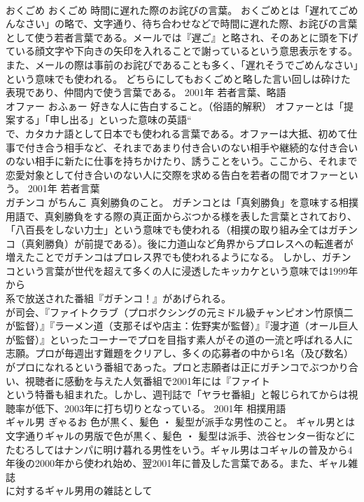 \documentclass[8pt]{extreport}
\begin{document}
\begin{CJK}{UTF8}{min}
\\	おくごめ	おくごめ	時間に遅れた際のお詫びの言葉。	おくごめとは「遅れてごめんなさい」の略で、文字通り、待ち合わせなどで時間に遅れた際、お詫びの言葉として使う若者言葉である。メールでは『遅ご』と略され、そのあとに頭を下げている顔文字や下向きの矢印を入れることで謝っているという意思表示をする。また、メールの際は事前のお詫びであることも多く、「遅れそうでごめんなさい」という意味でも使われる。 どちらにしてもおくごめと略した言い回しは砕けた表現であり、仲間内で使う言葉である。	2001年	若者言葉、略語	
\\	オファー	おふぁー	好きな人に告白すること。（俗語的解釈）	オファーとは「提案する」「申し出る」といった意味の英語“
\\	で、カタカナ語として日本でも使われる言葉である。オファーは大抵、初めて仕事で付き合う相手など、それまであまり付き合いのない相手や継続的な付き合いのない相手に新たに仕事を持ちかけたり、誘うことをいう。ここから、それまで恋愛対象として付き合いのない人に交際を求める告白を若者の間でオファーという。	2001年	若者言葉	
\\	ガチンコ	がちんこ	真剣勝負のこと。	ガチンコとは「真剣勝負」を意味する相撲用語で、真剣勝負をする際の真正面からぶつかる様を表した言葉とされており、「八百長をしない力士」という意味でも使われる（相撲の取り組み全てはガチンコ（真剣勝負）が前提である）。後に力道山など角界からプロレスへの転進者が増えたことでガチンコはプロレス界でも使われるようになる。 しかし、ガチンコという言葉が世代を超えて多くの人に浸透したキッカケという意味では1999年から
\\	系で放送された番組『ガチンコ！』があげられる。
\\	が司会、『ファイトクラブ（プロボクシングの元ミドル級チャンピオン竹原慎二が監督）』『ラーメン道（支那そばや店主：佐野実が監督）』『漫才道（オール巨人が監督）』といったコーナーでプロを目指す素人がその道の一流と呼ばれる人に志願。プロが毎週出す難題をクリアし、多くの応募者の中から1名（及び数名）がプロになれるという番組であった。プロと志願者は正にガチンコでぶつかり合い、視聴者に感動を与えた人気番組で2001年には『ファイト
\\	という特番も組まれた。しかし、週刊誌で「ヤラセ番組」と報じられてからは視聴率が低下、2003年に打ち切りとなっている。	2001年	相撲用語	
\\	ギャル男	ぎゃるお	色が黒く、髪色 ・ 髪型が派手な男性のこと。	ギャル男とは文字通りギャルの男版で色が黒く、髪色 ・ 髪型は派手、渋谷センター街などにたむろしてはナンパに明け暮れる男性をいう。ギャル男はコギャルの普及から4年後の2000年から使われ始め、翌2001年に普及した言葉である。また、ギャル雑誌
\\	に対するギャル男用の雑誌として

\end{CJK}
\end{document}
